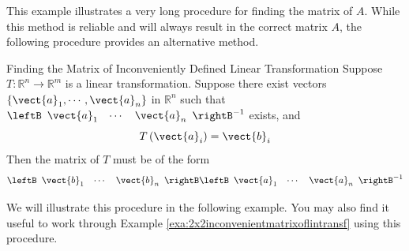 This example illustrates a very long procedure for finding the matrix of $A$. While this method is reliable and
will always result in the correct matrix $A$, the following procedure provides an alternative method. 

\begin{procedure}{Finding the Matrix of Inconveniently Defined Linear Transformation}\label{proc:findingmatrixoflineartransformation}
Suppose $T:\mathbb{R}^{n}\rightarrow \mathbb{R}^{m}$ is a linear transformation. Suppose there exist vectors $\left\{ \vect{a}_{1},\cdots ,\vect{a}_{n}\right\} $ in $\mathbb
{R}^{n}$ such that $\leftB
\begin{array}{ccc}
\vect{a}_{1} & \cdots & \vect{a}_{n}
\end{array}
\rightB ^{-1}$ exists, and 
\begin{equation*}
T \left(\vect{a}_{i}\right)=\vect{b}_{i}
\end{equation*}
Then the matrix of $T$ must be of the form
\begin{equation*}
\leftB
\begin{array}{ccc}
\vect{b}_{1} & \cdots & \vect{b}_{n}
\end{array}
\rightB \leftB
\begin{array}{ccc}
\vect{a}_{1} & \cdots & \vect{a}_{n}
\end{array}
\rightB ^{-1}
\end{equation*}
\end{procedure}

We will illustrate this procedure in the following example. You may also find it useful
to work through Example \ref{exa:2x2inconvenientmatrixoflintransf} using this procedure.


